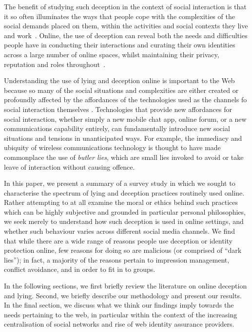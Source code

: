 \documentclass{sig-alternate}
\begin{document}
The benefit of studying such deception in the context of social interaction is that it so often illuminates the ways that people cope with the complexities of the social demands placed on them, within the activities and social contexts they live and work~\cite{camden1984white}.  Online, the use of deception can reveal both the needs and difficulties people have in conducting their interactions and curating their own identities across a large number of online spaces, whilst maintaining their privacy, reputation and roles throughout~\cite{hancock2007digital, Burgoon:2003:TDM:820748.821362}.  

Understanding the use of lying and deception online is important to the Web because so many of the social situations and complexities are either created or profoundly affected by the affordances of the technologies used as the channels fo social interaction themselves \cite{hancock2004deception}.  Technologies that provide new affordances for social interaction, whether simply a new mobile chat app, online forum, or a new communications capability entirely, can fundamentally introduce new social situations and tensions in unanticipated ways.  For example, the immediacy and ubiquity of wireless communications technology is thought to have made commonplace the use of \emph{butler lies}, which are small lies invoked to avoid or take leave of interaction \cite{hancock2009butler} without causing offence.  

In this paper, we present a summary of a survey study in which we sought to characterise the spectrum of lying and deception practices routinely used online.  Rather attempting to at all examine the moral or ethics behind such practices which can be highly subjective and grounded in particular personal philosophies, we seek merely to understand how such deception is used in online settings, and whether such behaviour varies across different social media channels. We find that while there are a wide range of reasons people use deception or identity protection online, few reasons for doing so are malicious (or comprised of ``dark lies''); in fact, a majority of the reasons pertain to impression management, conflict avoidance, and in order to fit in to groups.

In the following sections, we first briefly review the literature on online deception and lying. Second, we briefly describe our methodology and present our results. In the final section, we discuss what we think our findings imply towards the needs pertaining to the web, in particular within the context of the increasing centralisation of social networks and rise of web identity assurance providers.
\end{document}

